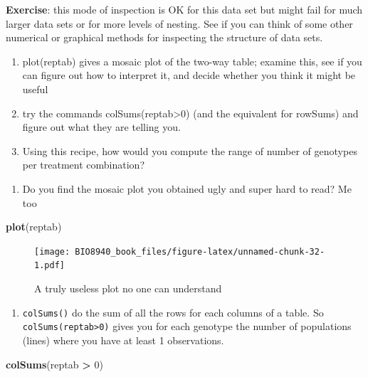 \documentclass[
  12pt,
]{book}
\makeatletter
\newenvironment{Shaded}{\begin{snugshade}}{\end{snugshade}}
\newcommand{\DecValTok}[1]{\textcolor[rgb]{0.00,0.00,0.81}{#1}}
\newcommand{\KeywordTok}[1]{\textcolor[rgb]{0.13,0.29,0.53}{\textbf{#1}}}
\newcommand{\NormalTok}[1]{#1}
\newcommand{\OperatorTok}[1]{\textcolor[rgb]{0.81,0.36,0.00}{\textbf{#1}}}
\newcommand{\StringTok}[1]{\textcolor[rgb]{0.31,0.60,0.02}{#1}}
\providecommand{\tightlist}{%
  \setlength{\itemsep}{0pt}\setlength{\parskip}{0pt}}
\newenvironment{kframe}{%
\medskip{}
\setlength{\fboxsep}{.8em}
\def\at@end@of@kframe{}%
\ifinner\ifhmode%
 \def\at@end@of@kframe{\end{minipage}}%
 \begin{minipage}{\columnwidth}%
\fi\fi%
\def\FrameCommand##1{\hskip\@totalleftmargin \hskip-\fboxsep
\colorbox{incolor}{##1}\hskip-\fboxsep
    \hskip-\linewidth \hskip-\@totalleftmargin \hskip\columnwidth}%
\MakeFramed {\advance\hsize-\width
  \@totalleftmargin\z@ \linewidth\hsize
  \@setminipage}}%
{\par\unskip\endMakeFramed%
\at@end@of@kframe}
\newenvironment{rmdblock}[1]
 {
 \begin{itemize}
 \renewcommand{\labelitemi}{
   \raisebox{-.7\height}[0pt][0pt]{
     {\setkeys{Gin}{width=3em,keepaspectratio}\texttt{[image: images/icons/\#1]}}
   }
 }
 \begin{kframe}
 \setlength{\fboxsep}{1em}
 \item
 }
 {
 \end{kframe}
 \end{itemize}
 }
\newenvironment{rmdcode}
  {\begin{rmdblock}{code}}
  {\end{rmdblock}}
\makeatother
\begin{document}
\begin{rmdcode}
\textbf{Exercise}: this mode of inspection is OK for this data set but might fail for much larger data sets or for more levels of nesting. See if you can think of some other numerical or graphical methods for inspecting the structure of data sets.

\begin{enumerate}
\def\labelenumi{\arabic{enumi}.}
\tightlist
\item
  plot(reptab) gives a mosaic plot of the two-way table; examine this, see if you can figure out how to interpret it, and decide whether you think it might be useful
\item
  try the commands colSums(reptab\textgreater0) (and the equivalent for rowSums) and figure out what they are telling you.
\item
  Using this recipe, how would you compute the range of number of genotypes per treatment combination?
\end{enumerate}
\end{rmdcode}

\begin{enumerate}
\def\labelenumi{\arabic{enumi}.}
\tightlist
\item
  Do you find the mosaic plot you obtained ugly and super hard to read? Me too 🤣
\end{enumerate}

\begin{Shaded}
\begin{Highlighting}[]
\KeywordTok{plot}\NormalTok{(reptab)}
\end{Highlighting}
\end{Shaded}

\begin{figure}
\centering
\texttt{[image: BIO8940\_book\_files/figure-latex/unnamed-chunk-32-1.pdf]}
\caption{\label{fig:unnamed-chunk-32}A truly useless plot no one can understand}
\end{figure}

\begin{enumerate}
\def\labelenumi{\arabic{enumi}.}
\setcounter{enumi}{1}
\tightlist
\item
  \texttt{colSums()} do the sum of all the rows for each columns of a table. So \texttt{colSums(reptab\textgreater{}0)} gives you for each genotype the number of populations (lines) where you have at least 1 observations.
\end{enumerate}

\begin{Shaded}
\begin{Highlighting}[]
\KeywordTok{colSums}\NormalTok{(reptab }\OperatorTok{>}\StringTok{ }\DecValTok{0}\NormalTok{)}
\end{Highlighting}
\end{Shaded}
\end{document}
